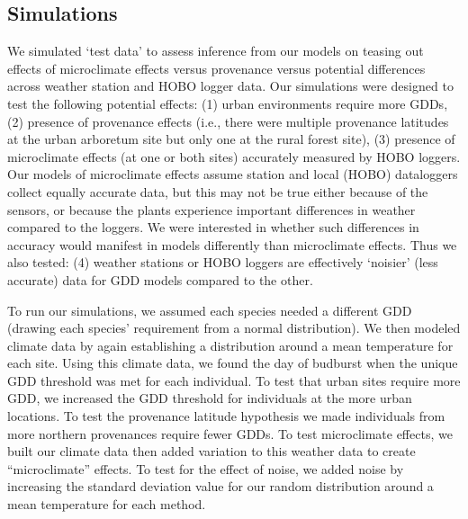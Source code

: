 \documentclass{article}\usepackage[]{graphicx}\usepackage[]{color}
\begin{document}
\subsection*{Simulations}
We simulated `test data' \citep[sometimes referred to as `artificial data,' see][]{Hunter1992} to assess inference from our models on teasing out effects of microclimate effects versus provenance versus potential differences across weather station and HOBO logger data. Our simulations were designed to test the following potential effects: (1) urban environments require more GDDs, (2) presence of provenance effects (i.e., there were multiple provenance latitudes at the urban arboretum site but only one at the rural forest site), (3) presence of microclimate effects (at one or both sites) accurately measured by HOBO loggers. Our models of microclimate effects assume station and local (HOBO) dataloggers collect equally accurate data, but this may not be true either because of the sensors, or because the plants experience important differences in weather compared to the loggers. We were interested in whether such differences in accuracy would manifest in models differently than microclimate effects. Thus we also tested: (4) weather stations or HOBO loggers are effectively `noisier' (less accurate) data for GDD models compared to the other. 

To run our simulations, we assumed each species needed a different GDD (drawing each species' requirement from a normal distribution). We then modeled climate data by again establishing a distribution around a mean temperature for each site. Using this climate data, we found the day of budburst when the unique GDD threshold was met for each individual. To test that urban sites require more GDD, we increased the GDD threshold for individuals at the more urban locations. To test the provenance latitude hypothesis we made individuals from more northern provenances require fewer GDDs. To test microclimate effects, we built our climate data then added variation to this weather data to create ``microclimate'' effects.  To test for the effect of noise, we added noise by increasing the standard deviation value for our random distribution around a mean temperature for each method.
\end{document}
